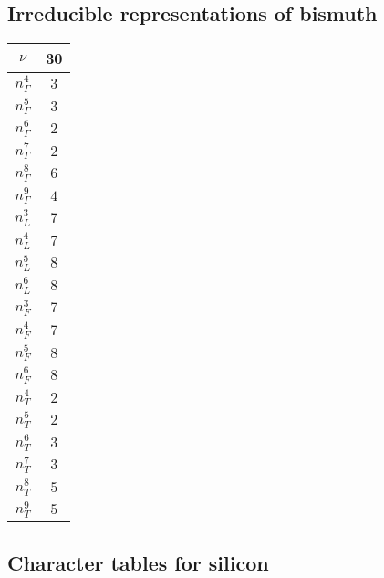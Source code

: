 \documentclass[3p,preprint]{elsarticle}
\begin{document}
\subsection{Irreducible representations of bismuth}
\label{app:n_BI}
\begin{table}[H]
	\begin{tabular}{|c|c|}\hline
		$\nu$ & 30 \\ \hline \hline
		$n_{\Gamma}^{4}$ & $3$\\ \hline
		$n_{\Gamma}^{5}$ & $3$\\ \hline
		$n_{\Gamma}^{6}$ & $2$\\ \hline
		$n_{\Gamma}^{7}$ & $2$\\ \hline
		$n_{\Gamma}^{8}$ & $6$\\ \hline
		$n_{\Gamma}^{9}$ & $4$\\ \hline \hline
		$n_{L}^{3}$ & $7$\\ \hline
		$n_{L}^{4}$ & $7$\\ \hline
		$n_{L}^{5}$ & $8$\\ \hline
		$n_{L}^{6}$ & $8$\\ \hline \hline
		$n_{F}^{3}$ & $7$\\ \hline
		$n_{F}^{4}$ & $7$\\ \hline
		$n_{F}^{5}$ & $8$\\ \hline
		$n_{F}^{6}$ & $8$\\ \hline \hline
		$n_{T}^{4}$ & $2$\\ \hline
		$n_{T}^{5}$ & $2$\\ \hline
		$n_{T}^{6}$ & $3$\\ \hline
		$n_{T}^{7}$ & $3$\\ \hline
		$n_{T}^{8}$ & $5$\\ \hline 
		$n_{T}^{9}$ & $5$\\ \hline 
	\end{tabular}
\end{table}

\subsection{Character tables for silicon~\cite{Bilbao}}\label{app:ch-si}
\end{document}
